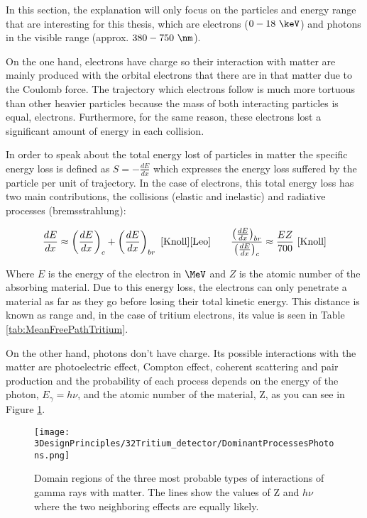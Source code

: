 In this section, the explanation will only focus on the particles and energy range that are interesting for this thesis, which are electrons ($0-18~\keV$) and photons in the visible range (approx. $380-750~\nm$).

On the one hand, electrons have charge so their interaction with matter are mainly produced with the orbital electrons that there are in that matter due to the Coulomb force. The trajectory which electrons follow is much more tortuous than other heavier particles because the mass of both interacting particles is equal, electrons. Furthermore, for the same reason, these electrons lost a significant amount of energy in each collision.

In order to speak about the total energy lost of particles in matter the specific energy loss is defined as $S=-\frac{dE}{dx}$ which expresses the energy loss suffered by the particle per unit of trajectory. In the case of electrons, this total energy loss has two main contributions, the collisions (elastic and inelastic) and radiative processes (bremsstrahlung):

\begin{equation}
\frac{dE}{dx} \approx \left(\frac{dE}{dx}\right)_{c} + \left(\frac{dE}{dx}\right)_{br} ~\cite{Knoll} \cite{Leo} \qquad  \frac{\left(\frac{dE}{dx}\right)_{br}}{\left(\frac{dE}{dx}\right)_{c}} \approx \frac{EZ}{700} ~\cite{Knoll}
\label{eq:ElectronInteraction}
\end{equation}

Where $E$ is the energy of the electron in $\MeV$ and $Z$ is the atomic number of the absorbing material. Due to this energy loss, the electrons can only penetrate a material as far as they go before losing their total kinetic energy. This distance is known as range and, in the case of tritium electrons, its value is seen in Table \ref{tab:MeanFreePathTritium}.

On the other hand, photons don't have charge. Its possible interactions with the matter are photoelectric effect, Compton effect, coherent scattering and pair production and the probability of each process depends on the energy of the photon, $E_\gamma = h\nu$, and the atomic number of the material, Z, as you can see in Figure \ref{fig:ProcessesPhotons}.

\begin{figure}[htbp]
\centering
\texttt{[image: 3DesignPrinciples/32Tritium\_detector/DominantProcessesPhotons.png]}
\caption{Domain regions of the three most probable types of interactions of gamma rays with matter. The lines show the values of Z and $h\nu$ where the two neighboring effects are equally likely.\label{fig:ProcessesPhotons}~\cite{Knoll}~\cite{Leo}}
\end{figure}

